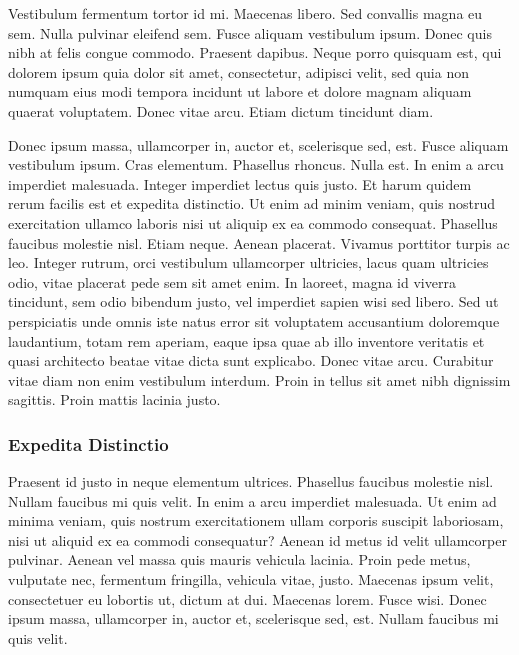 \documentclass[english,master,dept460,male,cpp,cpdeclaration]{diploma}
\begin{document}
Vestibulum fermentum tortor id mi. Maecenas libero. Sed convallis magna eu sem. Nulla pulvinar eleifend sem. Fusce aliquam vestibulum ipsum. Donec quis nibh at felis congue commodo. Praesent dapibus. Neque porro quisquam est, qui dolorem ipsum quia dolor sit amet, consectetur, adipisci velit, sed quia non numquam eius modi tempora incidunt ut labore et dolore magnam aliquam quaerat voluptatem. Donec vitae arcu. Etiam dictum tincidunt diam.

Donec ipsum massa, ullamcorper in, auctor et, scelerisque sed, est. Fusce aliquam vestibulum ipsum. Cras elementum. Phasellus rhoncus. Nulla est. In enim a arcu imperdiet malesuada. Integer imperdiet lectus quis justo. Et harum quidem rerum facilis est et expedita distinctio. Ut enim ad minim veniam, quis nostrud exercitation ullamco laboris nisi ut aliquip ex ea commodo consequat. Phasellus faucibus molestie nisl. Etiam neque. Aenean placerat. Vivamus porttitor turpis ac leo. Integer rutrum, orci vestibulum ullamcorper ultricies, lacus quam ultricies odio, vitae placerat pede sem sit amet enim. In laoreet, magna id viverra tincidunt, sem odio bibendum justo, vel imperdiet sapien wisi sed libero. Sed ut perspiciatis unde omnis iste natus error sit voluptatem accusantium doloremque laudantium, totam rem aperiam, eaque ipsa quae ab illo inventore veritatis et quasi architecto beatae vitae dicta sunt explicabo. Donec vitae arcu. Curabitur vitae diam non enim vestibulum interdum. Proin in tellus sit amet nibh dignissim sagittis. Proin mattis lacinia justo.

\subsubsection{Expedita Distinctio}
\label{sec:ExpeditaDistinctio}
Praesent id justo in neque elementum ultrices. Phasellus faucibus molestie nisl. Nullam faucibus mi quis velit. In enim a arcu imperdiet malesuada. Ut enim ad minima veniam, quis nostrum exercitationem ullam corporis suscipit laboriosam, nisi ut aliquid ex ea commodi consequatur? Aenean id metus id velit ullamcorper pulvinar. Aenean vel massa quis mauris vehicula lacinia. Proin pede metus, vulputate nec, fermentum fringilla, vehicula vitae, justo. Maecenas ipsum velit, consectetuer eu lobortis ut, dictum at dui. Maecenas lorem. Fusce wisi. Donec ipsum massa, ullamcorper in, auctor et, scelerisque sed, est. Nullam faucibus mi quis velit.
\end{document}
